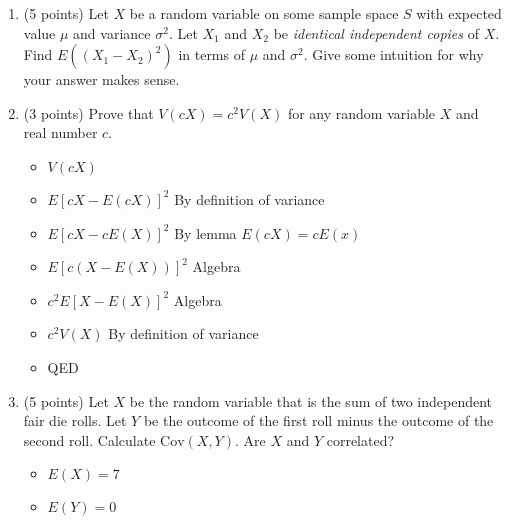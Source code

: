 \documentclass[11pt]{article}
\begin{document}
\begin{enumerate}


\item (5 points) Let $X$ be a random variable on some sample space $S$ with
expected value $\mu$ and variance $\sigma^2$.  Let $X_1$ and
$X_2$ be \emph{identical independent copies} of $X$.  Find
$E((X_1 - X_2)^2)$ in terms of $\mu$ and $\sigma^2$.  Give some intuition for 
why your answer makes sense.

\item (3 points) Prove that $V(cX) = c^2 V(X)$ for any random variable $X$ and
real number $c$.
\begin{itemize}
	\item $V(cX)$
	\item $E[cX - E(cX)]^{2}$ By definition of variance
	\item $E[cX - cE(X)]^{2}$ By lemma $E(cX) = cE(x)$
	\item $E[c(X-E(X))]^{2}$ Algebra
	\item $c^{2}E[X-E(X)]^{2}$ Algebra
	\item $c^{2}V(X)$ By definition of variance
	\item QED
\end{itemize}

\item (5 points) Let $X$ be the random variable that is the sum of two
independent fair die rolls.  Let $Y$ be the outcome of the first roll minus the
outcome of the second roll.  Calculate $\mathrm{Cov}(X,Y)$.
Are $X$ and $Y$ correlated?
\begin{itemize}
	\item $E(X) = 7$
	\item $E(Y) = 0$
\end{itemize}


\end{enumerate}
\end{document}
